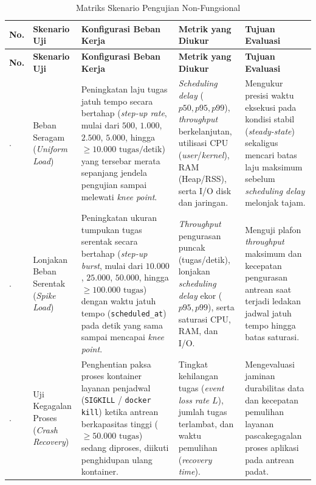 {\footnotesize\setlength{\tabcolsep}{4pt}%
\begin{longtable}{|>{\centering\arraybackslash}p{}|>{\raggedright\arraybackslash}p{}|>{\raggedright\arraybackslash}p{}|>{\raggedright\arraybackslash}p{}|>{\raggedright\arraybackslash}p{}|}
	\caption{Matriks Skenario Pengujian Non-Fungsional}
	\label{table:3.skenario_nonfungsional}\\
	\hline
	\textbf{No.} & \textbf{Skenario Uji} & \textbf{Konfigurasi Beban Kerja} & \textbf{Metrik yang Diukur} & \textbf{Tujuan Evaluasi} \\
	\hline
	\endfirsthead
	\hline
	\textbf{No.} & \textbf{Skenario Uji} & \textbf{Konfigurasi Beban Kerja} & \textbf{Metrik yang Diukur} & \textbf{Tujuan Evaluasi} \\
	\hline
	\endhead
	1. & Beban Seragam (\textit{Uniform Load}) & Peningkatan laju tugas jatuh tempo secara bertahap (\textit{step-up rate}, mulai dari $500$, $1.000$, $2.500$, $5.000$, hingga $\ge 10.000\text{ tugas/detik}$) yang tersebar merata sepanjang jendela pengujian sampai melewati \textit{knee point}. & \textit{Scheduling delay} ($p50, p95, p99$), \textit{throughput} berkelanjutan, utilisasi CPU (\textit{user}/\allowbreak\textit{kernel}), RAM (Heap/RSS), serta I/O disk dan jaringan. & Mengukur presisi waktu eksekusi pada kondisi stabil (\textit{steady-state}) sekaligus mencari batas laju maksimum sebelum \textit{scheduling delay} melonjak tajam. \\
	\hline
	2. & Lonjakan Beban Serentak (\textit{Spike Load}) & Peningkatan ukuran tumpukan tugas serentak secara bertahap (\textit{step-up burst}, mulai dari $10.000$, $25.000$, $50.000$, hingga $\ge 100.000\text{ tugas}$) dengan waktu jatuh tempo (\texttt{scheduled\_at}) pada detik yang sama sampai mencapai \textit{knee point}. & \textit{Throughput} pengurasan puncak (tugas/\allowbreak detik), lonjakan \textit{scheduling delay} ekor ($p95, p99$), serta saturasi CPU, RAM, dan I/O. & Menguji plafon \textit{throughput} maksimum dan kecepatan pengurasan antrean saat terjadi ledakan jadwal jatuh tempo hingga batas saturasi. \\
	\hline
	3. & Uji Kegagalan Proses (\textit{Crash Recovery}) & Penghentian paksa proses kontainer layanan penjadwal (\texttt{SIGKILL} / \texttt{docker kill}) ketika antrean berkapasitas tinggi ($\ge 50.000\text{ tugas}$) sedang diproses, diikuti penghidupan ulang kontainer. & Tingkat kehilangan tugas (\textit{event loss rate} $L$), jumlah tugas terlambat, dan waktu pemulihan (\textit{recovery time}). & Mengevaluasi jaminan durabilitas data dan kecepatan pemulihan layanan pascakegagalan proses aplikasi pada antrean padat. \\
	\hline
\end{longtable}}

